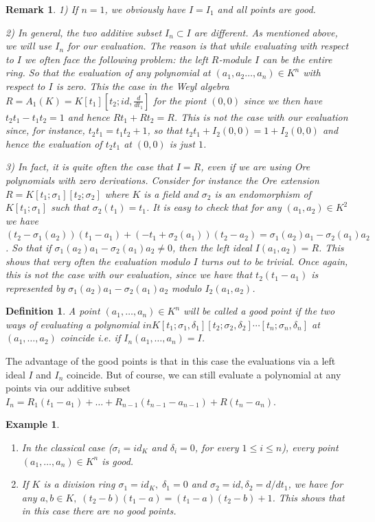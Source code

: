 \documentclass{amsproc}
\newcommand{\de}{\delta}
\newcommand{\si}{\sigma}
\newtheorem{definition}[theorem]{Definition}
\newtheorem{example}[theorem]{Example}
\newtheorem{remark}[theorem]{Remark}
\numberwithin{equation}{section}
\newcommand{\mulo}{K[t_1;\si_1,\de_1][t_2;\si_2,\de_2]\cdots[t_n;\si_n,\de_n]}
\begin{document}
\begin{remark}
	{\rm 
		1) If $n=1$, we obviously have $I=I_1$ and all points are good.
		
		2) In general, the two additive subset $I_n\subset I$ are different.  As mentioned above, we will use $I_n$ for our evaluation. The reason is that while evaluating with respect to $I$ we often face the following problem: the left $R$-module $I$ can be the entire ring.  So that the evaluation of any polynomial at $(a_1,a_2\dots,a_n)\in K^n$ with respect to $I$ is zero.  This the case in the Weyl algebra
		$R=A_1(K)=K[t_1][t_2;id,\frac{d}{dt_1}]$ for the piont $(0,0)$ since we then have $t_2t_1-t_1t_2=1$ and hence $Rt_1+Rt_2=R$.  This is not the case with our evaluation since, for instance, $t_2t_1=t_1t_2 +1 $,  so that $t_2t_1 +I_2(0,0) = 1 + I_2(0,0)$ and hence the evaluation of $t_2t_1$ at $(0,0)$ is just $1$.
		
		3) In fact,  it is quite often the case that $I=R$, even if we are using Ore polynomials with zero derivations. Consider for instance the Ore extension $R=K[t_1;\si_1][t_2;\si_2]$ where $K$ is a field and $\si_2$ is an endomorphism of $K[t_1;\si_1]$ such that $\si_2(t_1)=t_1$.  It is easy to check that for any $(a_1,a_2)\in K^2$ we have 
		$(t_2-\si_1(a_2))(t_1-a_1)+(-t_1+\si_2(a_1))(t_2-a_2)=\si_1(a_2)a_1-\si_2(a_1)a_2$.  So that if $\si_1(a_2)a_1-\si_2(a_1)a_2\ne 0$, then the left ideal $I(a_1,a_2)=R$.  This shows that very often the evaluation modulo $I$ turns out to be trivial.  Once again, this is not the case with our evaluation, since we have that 
		$t_2(t_1-a_1)$ is represented by  $\si_1(a_2)a_1-\si_2(a_1)a_2$ modulo $I_2(a_1,a_2)$.
	} 
\end{remark}

\begin{definition}
	A point $(a_1,\dots,a_n)\in K^n$ will be called a good point if the two ways of evaluating a polynomial $in \mulo$ at $(a_1,\dots,a_2)$ coincide i.e. if $I_n(a_1,\dots,a_n)= I$.
\end{definition}

The advantage of the good points is that in this case  the evaluations via a left ideal $I$ and $I_n$ coincide.
But of course, we can still evaluate a polynomial at any points via our additive subset $I_n=R_1(t_1-a_1)+ \dots +R_{n-1}(t_{n-1}-a_{n-1})+R(t_n-a_n)$.


\begin{example}
	\begin{enumerate}
		\item In the classical case ($\si_i=id_K$ and
		$\de_i=0$, for every $1\le i \le n$), every point $(a_1,\dots,a_n)\in K^n$ is good.
		\item If $K$ is a division ring $\si_1=id_K,\; \de_1=0$ and $\si_2=id,
		\de_2=d/dt_1$, we have for any $a,b\in K,\;
		(t_2-b)(t_1-a)=(t_1-a)(t_2-b)+1$.  This shows that in this case
		there are no good points.
	\end{enumerate}
\end{example}
\end{document}
